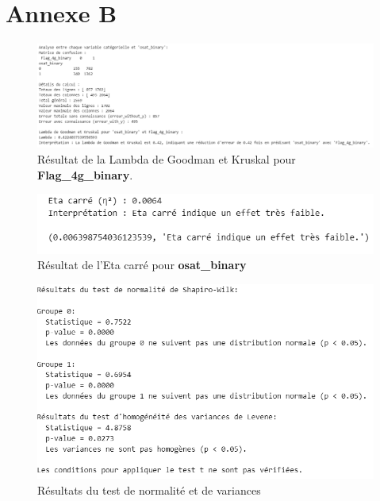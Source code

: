 \chapter*{Annexe B}
\adjustmtc
\thispagestyle{MyStyle}

\makeatletter\renewcommand{}\makeatother

\appendix


\begin{figure}[H]
    \centering
    \includegraphics[width=0.9\linewidth]{capture_sas_40.png}
    \caption{Résultat de la Lambda de Goodman et Kruskal pour \textbf{Flag\_4g\_binary}.}
    \label{AnB2}
\end{figure}

\begin{figure}[H]
    \centering
    \includegraphics[width=0.8\linewidth]{capture_sas_41.png}
    \caption{Résultat de l'Eta carré pour \textbf{osat\_binary}}
    \label{AnB3}
\end{figure}

\begin{figure}[H]
    \centering
    \includegraphics[width=0.8\linewidth]{capture_sas_42.png}
    \caption{Résultats du test de normalité et de variances}
    \label{AnB4}
\end{figure}

